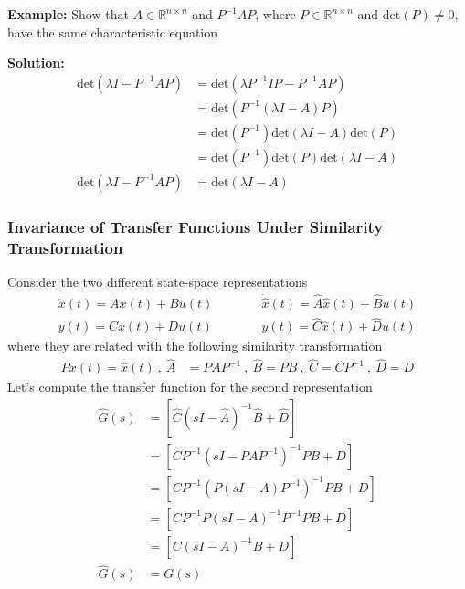 \documentclass[twoside]{article}
\begin{document}
\vspace{6pt}

\textbf{Example:} Show that $A \in \mathbb{R}^{n \times n}$ and $P^{-1} A
P$, where $P \in \mathbb{R}^{n \times n}$ and $\mathrm{det}(P) \neq 0$, have the
same characteristic equation

\textbf{Solution:} 
\begin{align*}
  \mathrm{det}\left(\lambda I - P^{-1} A P \right) &= 
\mathrm{det}\left( \lambda P^{-1} I P - P^{-1} A P \right)
\\
&= \mathrm{det} \left( P^{-1} \left( \lambda I - A \right) P \right)
\\
&= \mathrm{det} \left( P^{-1} \right)
\mathrm{det} \left( \lambda I - A \right) 
\mathrm{det} \left( P \right)
\\
&= \mathrm{det} \left( P^{-1} \right) \mathrm{det} \left( P \right)
\mathrm{det} \left( \lambda I - A \right) 
\\
\mathrm{det}\left(\lambda I - P^{-1} A P \right) &= \mathrm{det} \left( \lambda I - A \right) 
\end{align*}

\subsubsection{Invariance of Transfer Functions Under Similarity
  Transformation}

Consider the two different state-space representations
%
\begin{align*}
  \dot{x}(t) = A x(t) + B u(t)  \quad & \quad \quad \dot{\hat{x}}(t) = \hat{A} \hat{x}(t) + \hat{B} u(t) 
\\
  y(t) = C x(t) + D u(t) \quad & \quad \quad  y(t) = \hat{C} \hat{x}(t) + \hat{D} u(t)
\end{align*}
%
where they are related with the following similarity transformation
%
\begin{align*}
P x(t) = \hat{x}(t) \ , \
\hat{A} &= P  A P^{-1} \ , \ \hat{B} = P  B \ , \ \hat{C} = C P^{-1} \ ,
  \ \hat{D} = D
\end{align*}
%
Let's compute the transfer function for the second representation
%
\begin{align*}
  \hat{G}(s) &= \left[ \hat{C} \left(s I - \hat{A} \right)^{-1} \hat{B}
  + \hat{D} \right]
\\
&= \left[ C P^{-1} \left(s I - P  A P^{-1} \right)^{-1} P B
  + D \right]
\\
&= \left[ C P^{-1} \left( P \left( s I -   A \right) P^{-1} \right)^{-1} P B
  + D \right]
\\
&= \left[ C P^{-1} P \left( s I -   A \right)^{-1} P^{-1} P B
  + D \right]
\\
&= \left[ C \left( s I -   A \right)^{-1} B + D \right]
\\
\hat{G}(s) &= G(s)
\end{align*}
\end{document}
